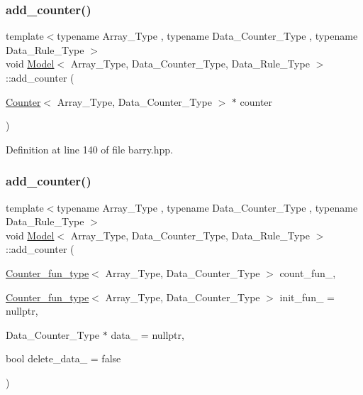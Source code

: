 \subsubsection{\texorpdfstring{add\+\_\+counter()}{add\_counter()}\hspace{0.1cm}{\footnotesize\ttfamily [2/3]}}
{\footnotesize\ttfamily template$<$typename Array\+\_\+\+Type , typename Data\+\_\+\+Counter\+\_\+\+Type , typename Data\+\_\+\+Rule\+\_\+\+Type $>$ \\
void \hyperlink{classbarry_1_1_model}{Model}$<$ Array\+\_\+\+Type, Data\+\_\+\+Counter\+\_\+\+Type, Data\+\_\+\+Rule\+\_\+\+Type $>$\+::add\+\_\+counter (\begin{DoxyParamCaption}\item[{\hyperlink{classbarry_1_1_counter}{Counter}$<$ Array\+\_\+\+Type, Data\+\_\+\+Counter\+\_\+\+Type $>$ $\ast$}]{counter }\end{DoxyParamCaption})\hspace{0.3cm}{\ttfamily [inline]}}



Definition at line 140 of file barry.\+hpp.

\mbox{\label{classbarry_1_1_model_a4e4a18943bda513a844dc11aa088a698}} 
\subsubsection{\texorpdfstring{add\+\_\+counter()}{add\_counter()}\hspace{0.1cm}{\footnotesize\ttfamily [3/3]}}
{\footnotesize\ttfamily template$<$typename Array\+\_\+\+Type , typename Data\+\_\+\+Counter\+\_\+\+Type , typename Data\+\_\+\+Rule\+\_\+\+Type $>$ \\
void \hyperlink{classbarry_1_1_model}{Model}$<$ Array\+\_\+\+Type, Data\+\_\+\+Counter\+\_\+\+Type, Data\+\_\+\+Rule\+\_\+\+Type $>$\+::add\+\_\+counter (\begin{DoxyParamCaption}\item[{\hyperlink{namespacebarry_a89b0a03ea2e7f83f2ae89be70a798337}{Counter\+\_\+fun\+\_\+type}$<$ Array\+\_\+\+Type, Data\+\_\+\+Counter\+\_\+\+Type $>$}]{count\+\_\+fun\+\_\+,  }\item[{\hyperlink{namespacebarry_a89b0a03ea2e7f83f2ae89be70a798337}{Counter\+\_\+fun\+\_\+type}$<$ Array\+\_\+\+Type, Data\+\_\+\+Counter\+\_\+\+Type $>$}]{init\+\_\+fun\+\_\+ = {\ttfamily nullptr},  }\item[{Data\+\_\+\+Counter\+\_\+\+Type $\ast$}]{data\+\_\+ = {\ttfamily nullptr},  }\item[{bool}]{delete\+\_\+data\+\_\+ = {\ttfamily false} }\end{DoxyParamCaption})\hspace{0.3cm}{\ttfamily [inline]}}




